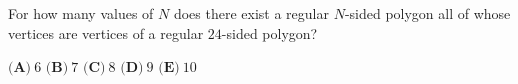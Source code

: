 For how many values of $N$ does there exist a regular $N$-sided polygon all of whose vertices are vertices of a regular $24$-sided polygon?

$\textbf{(A)}\ $$6$ \qquad $\textbf{(B)}\ $$7$ \qquad $\textbf{(C)}\ $$8$ \qquad $\textbf{(D)}\ $$9$ \qquad $\textbf{(E)}\ $$10$
